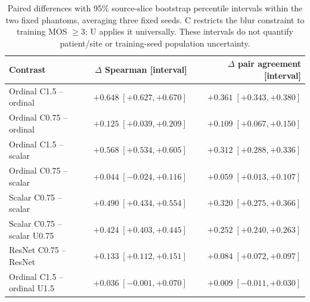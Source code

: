 \begin{table}[ht]\centering\scriptsize
\caption{Paired differences with 95\% source-slice bootstrap percentile intervals within the two fixed phantoms, averaging three fixed seeds. C restricts the blur constraint to training MOS $\geq3$; U applies it universally. These intervals do not quantify patient/site or training-seed population uncertainty.}
\begin{tabular}{lrr}\toprule Contrast & $\Delta$ Spearman [interval] & $\Delta$ pair agreement [interval] \\ \midrule
Ordinal C1.5 -- ordinal & $+0.648\;[+0.627,+0.670]$ & $+0.361\;[+0.343,+0.380]$ \\
Ordinal C0.75 -- ordinal & $+0.125\;[+0.039,+0.209]$ & $+0.109\;[+0.067,+0.150]$ \\
Ordinal C1.5 -- scalar & $+0.568\;[+0.534,+0.605]$ & $+0.312\;[+0.288,+0.336]$ \\
Ordinal C0.75 -- scalar & $+0.044\;[-0.024,+0.116]$ & $+0.059\;[+0.013,+0.107]$ \\
Scalar C0.75 -- scalar & $+0.490\;[+0.434,+0.554]$ & $+0.320\;[+0.275,+0.366]$ \\
Scalar C0.75 -- scalar U0.75 & $+0.424\;[+0.403,+0.445]$ & $+0.252\;[+0.240,+0.263]$ \\
ResNet C0.75 -- ResNet & $+0.133\;[+0.112,+0.151]$ & $+0.084\;[+0.072,+0.097]$ \\
Ordinal C1.5 -- ordinal U1.5 & $+0.036\;[-0.001,+0.070]$ & $+0.009\;[-0.011,+0.030]$ \\
\bottomrule\end{tabular}\label{tab:paired}\end{table}
